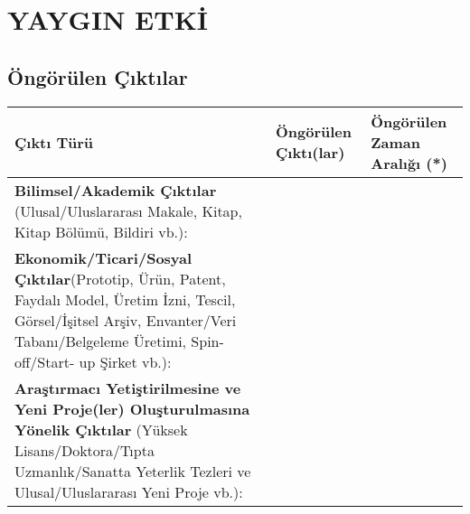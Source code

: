 \documentclass[a4paper]{article}
\begin{document}
\section{YAYGIN ETKİ}


\subsection{Öngörülen Çıktılar}


\begin{center}
\begin{tabular}{|m{}|m{}|m{}|}
\hline
\multicolumn{1}{|Q{0.31\textwidth}}{\textbf{Çıktı Türü}} &
\multicolumn{1}{|M{0.31\textwidth}}{\textbf{Öngörülen Çıktı(lar)}} &
\multicolumn{1}{|M{0.31\textwidth}|}{\textbf{Öngörülen Zaman Aralığı (*)}}
\\ \hline
\multicolumn{1}{|P{0.31\textwidth}|}{\textbf{Bilimsel/Akademik Çıktılar}\newline
(Ulusal/Uluslararası Makale, Kitap, Kitap Bölümü, Bildiri vb.): } & &
\\ \hline
\multicolumn{1}{|P{0.31\textwidth}|}{\textbf{Ekonomik/Ticari/Sosyal Çıktılar}\newline (Prototip, Ürün, Patent, Faydalı Model, Üretim İzni, Tescil, Görsel/İşitsel Arşiv, Envanter/Veri Tabanı/Belgeleme Üretimi, Spin-off/Start- up Şirket vb.): } 
& &
\\ \hline
\multicolumn{1}{|P{0.31\textwidth}|}{\textbf{Araştırmacı Yetiştirilmesine ve Yeni Proje(ler) Oluşturulmasına Yönelik Çıktılar}\newline
(Yüksek Lisans/Doktora/Tıpta Uzmanlık/Sanatta Yeterlik Tezleri ve Ulusal/Uluslararası Yeni Proje vb.): } 
& &
\\ \hline
\end{tabular}
\end{center}
\end{document}
